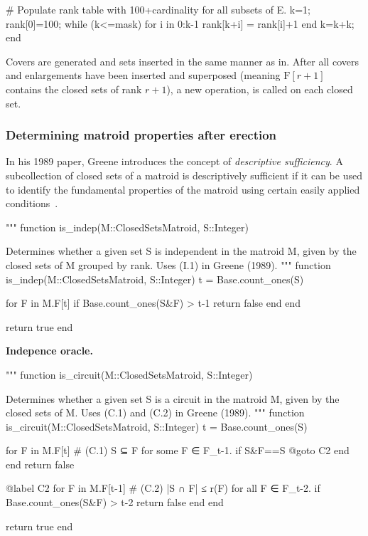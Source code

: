 \begin{jllisting}
  # Populate rank table with 100+cardinality for all subsets of E.
  k=1; rank[0]=100;
  while (k<=mask)
    for i in 0:k-1 rank[k+i] = rank[i]+1 end
    k=k+k;
  end
\end{jllisting}

Covers are generated and sets inserted in the same manner as in\linebreak{}. After all covers and enlargements have been inserted and superposed (meaning $\mathrm{F}[r+1]$ contains the closed sets of rank $r+1$), a new operation,  is called on each closed set.

\skelpar

\subsubsection{Determining matroid properties after erection}
In his 1989 paper, Greene introduces the concept of \textit{descriptive sufficiency}. A subcollection of closed sets of a matroid is descriptively sufficient if it can be used to identify the fundamental properties of the matroid using certain easily applied conditions~\cite{greene-1991}. 

\begin{jllisting}
"""
  function is_indep(M::ClosedSetsMatroid, S::Integer)

Determines whether a given set S is independent in the matroid M, given by the closed sets of M grouped by rank. Uses (I.1) in Greene (1989).
"""
function is_indep(M::ClosedSetsMatroid, S::Integer)
  t = Base.count_ones(S)

  for F in M.F[t]
    if Base.count_ones(S&F) > t-1 return false end
  end

  return true
end
\end{jllisting}

\textbf{Indepence oracle.} \skelpar

\begin{jllisting}
"""
    function is_circuit(M::ClosedSetsMatroid, S::Integer)

Determines whether a given set S is a circuit in the matroid M, given by the closed sets of M. Uses (C.1) and (C.2) in Greene (1989).
"""
function is_circuit(M::ClosedSetsMatroid, S::Integer)
  t = Base.count_ones(S)

  for F in M.F[t] # (C.1) S ⊆ F for some F ∈ F_{t-1}.
    if S&F==S @goto C2 end
  end
  return false

  @label C2
  for F in M.F[t-1] # (C.2) |S ∩ F| ≤ r(F) for all F ∈ F_{t-2}.
    if Base.count_ones(S&F) > t-2 return false end
  end

  return true
end
\end{jllisting}


